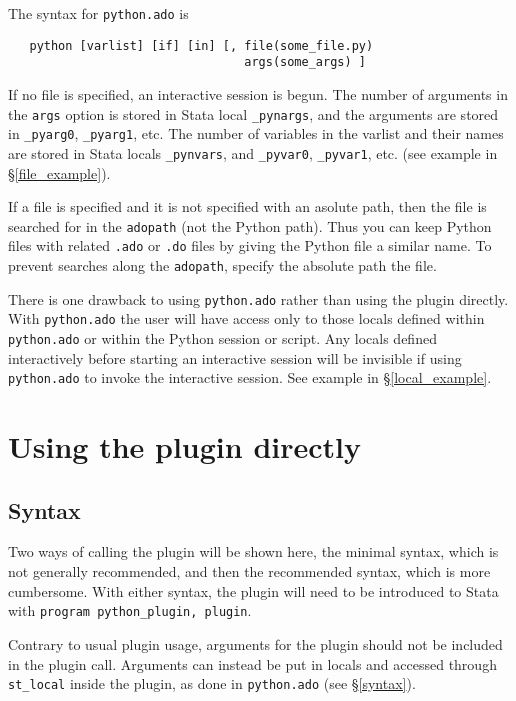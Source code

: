 \documentclass{article}
\begin{document}
The syntax for \lstinline$python.ado$ is
\begin{lstlisting}
   python [varlist] [if] [in] [, file(some_file.py) 
                                 args(some_args) ]
\end{lstlisting}
  
  If no file is specified, an interactive session is begun. The number of arguments in the \lstinline{args} option is stored in Stata local \lstinline$_pynargs$, and the arguments are stored in \lstinline$_pyarg0$, \lstinline$_pyarg1$, etc. The number of variables in the varlist and their names are stored in Stata locals \lstinline$_pynvars$, and \lstinline$_pyvar0$, \lstinline$_pyvar1$, etc. (see example in \S\ref{file_example}).
	
	If a file is specified and it is not specified with an asolute path, then the file is searched for in the \lstinline{adopath} (not the Python path). Thus you can keep Python files with related \lstinline{.ado} or \lstinline{.do} files by giving the Python file a similar name. To prevent searches along the \lstinline{adopath}, specify the absolute path the file.
		
There is one drawback to using \lstinline$python.ado$ rather than using the plugin directly. With  \lstinline$python.ado$ the user will have access only to those locals defined within \lstinline$python.ado$ or within the Python session or script. Any locals defined interactively before starting an interactive session will be invisible if using \lstinline$python.ado$ to invoke the interactive session. See example in \S\ref{local_example}.



\section{Using the plugin directly} \label{using_plugin}

\subsection{Syntax}
	
Two ways of calling the plugin will be shown here, the minimal syntax, which is not generally recommended, and then the recommended syntax, which is more cumbersome. With either syntax, the plugin will need to be introduced to Stata with \lstinline{program python_plugin, plugin}. 
	
Contrary to usual plugin usage, arguments for the plugin should not be included in the plugin call. Arguments can instead be put in locals and accessed through \lstinline{st_local} inside the plugin, as done in \lstinline{python.ado} (see \S\ref{syntax}).
\end{document}

